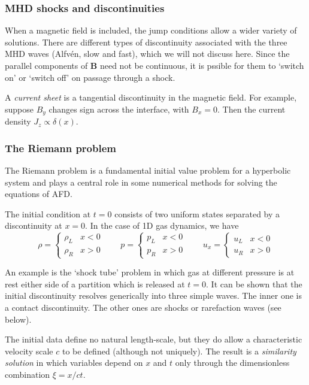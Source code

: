\documentclass{jknotes}
\newcommand{\B}{\symbf{B}}
\begin{document}
\subsubsection{MHD shocks and discontinuities}
When a magnetic field is included, the jump conditions allow a wider variety
of solutions. There are different types of discontinuity associated with the
three MHD waves (Alfv\'{e}n, slow and fast), which we will not discuss here.
Since the parallel components of $\B$ need not be continuous, it is pssible
for them to `switch on' or `switch off' on passage through a shock. 

A \emph{current sheet} is a tangential discontinuity in the magnetic field.
For example, suppose $B_y$ changes sign across the interface, with $B_x = 0$.
Then the current density $J_z \propto \delta(x)$.

\subsubsection{The Riemann problem}
The Riemann problem is a fundamental initial value problem for a hyperbolic
system and plays a central role in some numerical methods for solving the
equations of AFD.

The initial condition at $t=0$ consists of two uniform states separated by a
discontinuity at $x=0$. In the case of 1D gas dynamics, we have
\begin{equation}
	\rho = \begin{cases} \rho_L & x < 0 \\ \rho_R & x > 0 \end{cases}
	\hspace{2em}
	p = \begin{cases} p_L & x < 0 \\ p_R & x > 0 \end{cases}
	\hspace{2em}
	u_x = \begin{cases} u_L & x < 0 \\ u_R & x > 0 \end{cases}
\end{equation}

An example is the `shock tube' problem in which gas at different pressure is
at rest either side of a partition which is released at $t=0$. It can be shown
that the initial discontinuity resolves generically into three simple waves.
The inner one is a contact discontinuity. The other ones are shocks or
rarefaction waves (see below).

The initial data define no natural length-scale, but they do allow a
characteristic velocity scale $c$ to be defined (although not uniquely). The
result is a \emph{similarity solution} in which variables depend on $x$ and
$t$ only through the dimensionless combination $\xi = x/ct$. 
\end{document}
